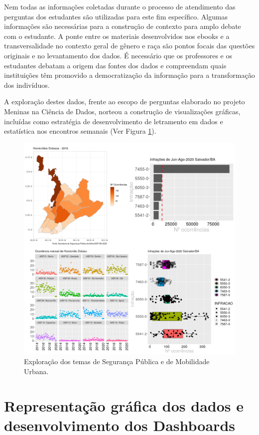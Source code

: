 \documentclass[
]{book}
\begin{document}
Nem todas as informações coletadas durante o processo de atendimento das perguntas dos estudantes são utilizadas para este fim específico. Algumas informações são necessárias para a construção de contexto para amplo debate com o estudante. A ponte entre os materiais desenvolvidos nos ebooks e a transversalidade no contexto geral de gênero e raça são pontos focais das questões originais e no levantamento dos dados. É necessário que os professores e os estudantes debatam a origem das fontes dos dados e compreendam quais instituições têm promovido a democratização da informação para a transformação dos indivíduos.

A exploração destes dados, frente ao escopo de perguntas elaborado no projeto Meninas na Ciência de Dados, norteou a construção de visualizações gráficas, incluídas como estratégia de desenvolvimento de letramento em dados e estatística nos encontros semanais (Ver Figura \ref{fig:reunicossa}).

\begin{figure}
\includegraphics[width=13.33in]{images/imagereunida} \caption{Exploração dos temas de Segurança Pública e de Mobilidade Urbana.}\label{fig:reunicossa}
\end{figure}

\hypertarget{representauxe7uxe3o-gruxe1fica-dos-dados-e-desenvolvimento-dos-dashboards}{%
\section{Representação gráfica dos dados e desenvolvimento dos Dashboards}\label{representauxe7uxe3o-gruxe1fica-dos-dados-e-desenvolvimento-dos-dashboards}}
\end{document}
